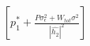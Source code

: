 \documentclass[preview]{standalone}
\begin{document}
\begin{align*}
\left[p_1^\ast + \frac{P \sigma_\epsilon^2 + W_{tot} \sigma^2}{\left|\hat{h_2}\right|^2}\right]
\end{align*}
\end{document}
